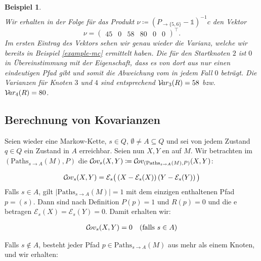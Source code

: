 \documentclass[a4paper]{article}
\newcommand{\mc}{Markow-Kette}
\newtheorem{beispiel}[satz]{Beispiel}
\theoremstyle{nonumberplain}
\begin{document}
\begin{beispiel}
\begin{align*}
	\end{align*}
	Wir erhalten in der Folge für das Produkt $\nu \coloneqq (P_{\rightarrow \{5,6\}} - \mathbb{1})^{-1}c$ den Vektor
	\begin{equation*}
	\nu = \begin{pmatrix} 45 & 0 & 58 & 80 & 0 & 0 \end{pmatrix}^\intercal\text{.}
	\end{equation*}
	Im ersten Eintrag des Vektors sehen wir genau wieder die Varianz, welche wir bereits in Beispiel \ref{example-mc} ermittelt haben. Die \var{} für den Startknoten $2$ ist $0$ in Übereinstimmung mit der Eigenschaft, dass es von dort aus nur einen eindeutigen Pfad gibt und somit die Abweichung vom \expect{} in jedem Fall $0$ beträgt. Die Varianzen für Knoten $3$ und $4$ sind entsprechend $\mathcal{V}\!ar_3(R) = 58$ bzw. $\mathcal{V}\!ar_4(R) = 80$.
	
\end{beispiel}

\subsection{Berechnung von Kovarianzen}

Seien wieder \mcex{} eine \mc{}, $s \in Q$, $\emptyset \neq A \subseteq Q$ und sei von jedem Zustand $q\in Q$ ein Zustand in $A$ erreichbar. Seien nun $X, Y$ \reward{}en auf $M$. Wir betrachten im \probspacen{} $(\mathrm{Paths}_{s \rightarrow A}(M), P)$ die \cov{} $\mathcal{C}\!ov_s(X,Y) \coloneqq \mathcal{C}\!ov_{(\mathrm{Paths}_{s \rightarrow A}(M), P)}(X,Y)$:

\begin{equation}
\mathcal{C}\!ov_{s}(X,Y) = \mathcal{E}_{s}\big(\left(X - \mathcal{E}_{s} (X)\right)\left(Y - \mathcal{E}_{s} (Y)\right)\big)
\end{equation}
Falls $s \in A$, gilt $|\mathrm{Paths}_{s \rightarrow A}(M)| = 1$ mit dem einzigen enthaltenen Pfad $p = (s)$. Dann sind nach Definition $P(p) = 1$ und $R(p) = 0$ und die \expect{}e betragen $\mathcal{E}_{s}(X) = \mathcal{E}_{s}(Y) = 0$. Damit erhalten wir:

\begin{align}
\mathcal{C}\!ov_{s}(X,Y) = 0 && \text{(falls $s \in A$)}\label{cov_trivial}
\end{align}

Falls $s \notin A$, besteht jeder Pfad $p \in \mathrm{Paths}_{s \rightarrow A}(M)$ aus mehr als einem Knoten, und wir erhalten:
\end{document}

